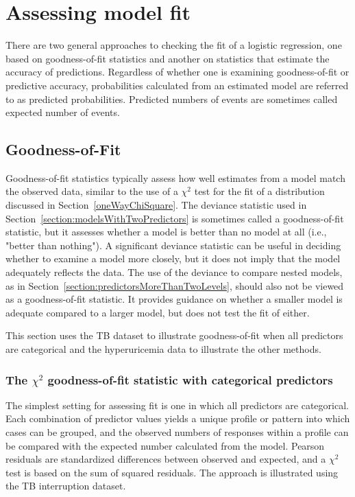 \section{Assessing model fit}
\label{assessingModelFitMultipleLogisticRegression}

There are two general approaches to checking the fit of a logistic regression, one based on goodness-of-fit statistics and another on statistics that estimate the accuracy of predictions. Regardless of whether one is examining goodness-of-fit or predictive accuracy, probabilities calculated from an estimated  model are referred to as predicted probabilities.  Predicted numbers of events are sometimes called expected number of events.

\subsection{Goodness-of-Fit}

Goodness-of-fit statistics typically assess how well estimates from a model match the observed data, similar to the use of a $\chi^2$ test for the fit of a distribution discussed in Section~\ref{oneWayChiSquare}. The deviance statistic used in Section~\ref{section:modelsWithTwoPredictors} is sometimes called a goodness-of-fit statistic, but it assesses whether a model is better than no model at all (i.e., "better than nothing"). A significant deviance statistic can be useful in deciding whether to examine a model more closely, but it does not imply that the model adequately reflects the data.  The use of the deviance to compare nested models, as in  Section~\ref{section:predictorsMoreThanTwoLevels}, should also not be viewed as a goodness-of-fit statistic.  It provides guidance on whether a smaller model is adequate compared to a larger model, but does not test the fit of either.

This section uses the TB dataset to illustrate goodness-of-fit when all predictors are categorical and the hyperuricemia data to illustrate the other methods.

\subsubsection{The $\chi^2$ goodness-of-fit statistic with categorical predictors}

The simplest setting for assessing fit is one in which all predictors are categorical.  Each combination of predictor values yields a unique profile or pattern into which cases can be grouped, and the observed numbers of responses within a profile can be compared with the expected number calculated from the model.  Pearson residuals are standardized differences between observed and expected, and a $\chi^2$ test is based on the sum of squared residuals.  The approach is illustrated using the TB interruption dataset.

